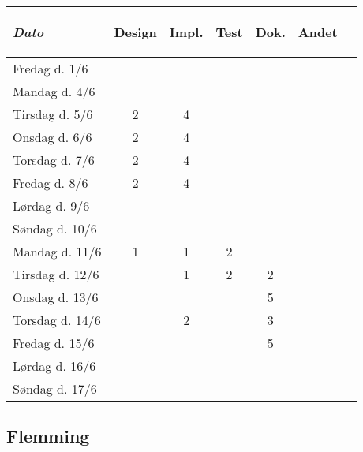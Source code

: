 \documentclass[a4paper]{article}
\begin{document}
\begin{tabular}{l | c c c c c | c}

  \emph{Dato}
  & \begin{sideways}Design\end{sideways} 
  & \begin{sideways}Impl.\end{sideways} 
  & \begin{sideways}Test\end{sideways} 
  & \begin{sideways}Dok.\end{sideways} 
  & \begin{sideways}Andet\end{sideways} \\
  \hline
  Fredag d. 1/6   &  &  &  &  & \\
  Mandag d. 4/6   &  &  &  &  & \\
  Tirsdag d. 5/6  & 2 & 4  &  &  & \\
  Onsdag d. 6/6   & 2 & 4 &  &  & \\
  Torsdag d. 7/6  & 2 & 4 &  &  & \\
  Fredag d. 8/6   & 2 & 4 &  &  & \\
  Lørdag d. 9/6   &  &  &  &  & \\
  Søndag d. 10/6  &  &  &  &  & \\
  Mandag d. 11/6  & 1 & 1 & 2 &  & \\
  Tirsdag d. 12/6 &  & 1 & 2 & 2 & \\
  Onsdag d. 13/6  &  &  &  & 5 & \\
  Torsdag d. 14/6 &  & 2 &  & 3 & \\
  Fredag d. 15/6  &  &  &  & 5 & \\
  Lørdag d. 16/6  &  &  &  &  & \\
  Søndag d. 17/6  &  &  &  &  & \\

\end{tabular}

\subsection{Flemming} %
\end{document}
